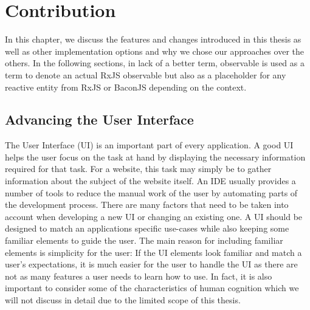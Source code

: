\chapter{Contribution}
\label{ch:Contribution}
In this chapter, we discuss the features and changes introduced in this thesis as well as other implementation options and why we chose our approaches over the others. In the following sections, in lack of a better term, observable is used as a term to denote an actual RxJS observable but also as a placeholder for any reactive entity from RxJS or BaconJS depending on the context.

\section{Advancing the User Interface}
The User Interface (UI) is an important part of every application. A good UI helps the user focus on the task at hand by displaying the necessary information required for that task. For a website, this task may simply be to gather information about the subject of the website itself. An IDE usually provides a number of tools to reduce the manual work of the user by automating parts of the development process. There are many factors that need to be taken into account when developing a new UI or changing an existing one. A UI should be designed to match an applications specific use-cases while also keeping some familiar elements to guide the user. The main reason for including familiar elements is simplicity for the user: If the UI elements look familiar and match a user's expectations, it is much easier for the user to handle the UI as there are not as many features a user needs to learn how to use. In fact, it is also important to consider some of the characteristics of human cognition which we will not discuss in detail due to the limited scope of this thesis.\\
  
